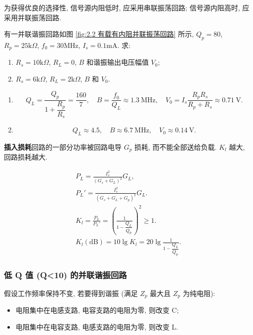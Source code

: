 为获得优良的选择性, 信号源内阻低时, 应采用串联振荡回路; 信号源内阻高时, 应采用并联振荡回路.

\begin{exampleprob}
    有一并联谐振回路如图 \ref{fig:2.2 有载有内阻并联振荡回路} 所示, $Q_p=80$, $R_p=25\mathrm{k}\Omega$, $f_0=30$MHz, $I_s=0.1$mA. 求:

    \begin{enumerate}
        \item $R_s=10\mathrm{k}\Omega$, $R_L=0$, $B$ 和谐振输出电压幅值 $V_0$;
        \item $R_s=6\mathrm{k}\Omega$, $R_L=2\mathrm{k}\Omega$, $B$ 和 $V_0$.
    \end{enumerate}

    \begin{solution}
        \begin{enumerate}
            \item \begin{equation*}
                      Q_L=\frac{Q_p}{1+\dfrac{R_p}{R_s}}=\frac{160}{7},\quad B=\frac{f_0}{Q_L}\approx 1.3\ \mathrm{MHz},\quad V_0=I_s\frac{R_pR_s}{R_p+R_s}\approx 0.71\ \mathrm{V}.
                  \end{equation*}
            \item \begin{equation*}
                      Q_L\approx 4.5,\quad B\approx 6.7\ \mathrm{MHz},\quad V_0\approx 0.14\ \mathrm{V}.
                  \end{equation*}
        \end{enumerate}
    \end{solution}
\end{exampleprob}

\textbf{插入损耗}\quad 回路的一部分功率被回路电导 $G_p$ 损耗, 而不能全部送给负载. $K_l$ 越大, 回路损耗越大.

\rmg
\begin{gather}
    P_L=\frac{I_s^2}{(G_s+G_L)^2}G_L, \\
    P_L'=\frac{I_s^2}{(G_s+G_L+G_p)^2}G_L. \\
    K_l=\frac{P_L}{P_L'}=\left(\frac{1}{1-\dfrac{Q_L}{Q_p}}\right)^2\geq 1. \\
    K_l(\mathrm{dB})=10\lg K_l=20\lg\frac{1}{1-\dfrac{Q_L}{Q_p}}.
\end{gather}

\subsubsection{低 Q 值 (Q<10) 的并联谐振回路}

假设工作频率保持不变, 若要得到谐振 (满足 $Z_p$ 最大且 $Z_p$ 为纯电阻):

\begin{itemize}
    \item 电阻集中在电感支路, 电容支路的电阻为零, 则改变 C;
    \item 电阻集中在电容支路, 电感支路的电阻为零, 则改变 L.
\end{itemize}
